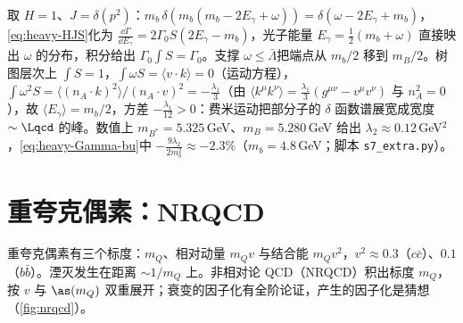 \begin{example}[端点区的树图检验]\label{ex:heavy-photon}
取 $H=1$、$J=\delta(p^2)$：$m_b\,\delta(m_b(m_b-2E_\gamma+\omega))=\delta(\omega-2E_\gamma+m_b)$，\cref{eq:heavy-HJS}化为 $\frac{\dd\Gamma}{\dd E_\gamma}=2\Gamma_0S(2E_\gamma-m_b)$，光子能量 $E_\gamma=\frac12(m_b+\omega)$ 直接映出 $\omega$ 的分布，积分给出 $\Gamma_0\int S=\Gamma_0$。支撑 $\omega\le\bar\Lambda$\cite{Neubert1994b}把端点从 $m_b/2$ 移到 $m_B/2$。树图层次上 $\int S=1$，$\int\omega S=\langle v\cdot k\rangle=0$（运动方程），$\int\omega^2S=\langle(n_A\cdot k)^2\rangle/(n_A\cdot v)^2=-\frac{\lambda_1}{3}$（由 $\langle k^\mu k^\nu\rangle=\frac{\lambda_1}{3}(g^{\mu\nu}-v^\mu v^\nu)$ 与 $n_A^2=0$），故 $\langle E_\gamma\rangle=m_b/2$，方差 $-\frac{\lambda_1}{12}>0$：费米运动把部分子的 $\delta$ 函数谱展宽成宽度 $\sim\Lqcd$ 的峰。数值上 $m_{B^*}=5.325$\,GeV、$m_B=5.280$\,GeV 给出 $\lambda_2\approx0.12$\,GeV$^2$，\cref{eq:heavy-Gamma-bu}中 $-\frac{9\lambda_2}{2m_b^2}\approx-2.3\%$（$m_b=4.8$\,GeV；脚本 \texttt{s7\_\allowbreak extra.py}）。
\end{example}

\section{重夸克偶素：NRQCD}\label{sec:heavy-nrqcd}

重夸克偶素有三个标度：$m_Q$、相对动量 $m_Qv$ 与结合能 $m_Qv^2$，$v^2\approx0.3$（$c\bar c$）、$0.1$（$b\bar b$）\cite[第~II.A~节]{BodwinBraatenLepage1995}。湮灭发生在距离 $\sim1/m_Q$ 上。非相对论 QCD（NRQCD）积出标度 $m_Q$，按 $v$ 与 $\as(m_Q)$ 双重展开\cite{CaswellLepage1986,BodwinBraatenLepage1995}；衰变的因子化有全阶论证，产生的因子化是猜想（\cref{fig:nrqcd}）。

